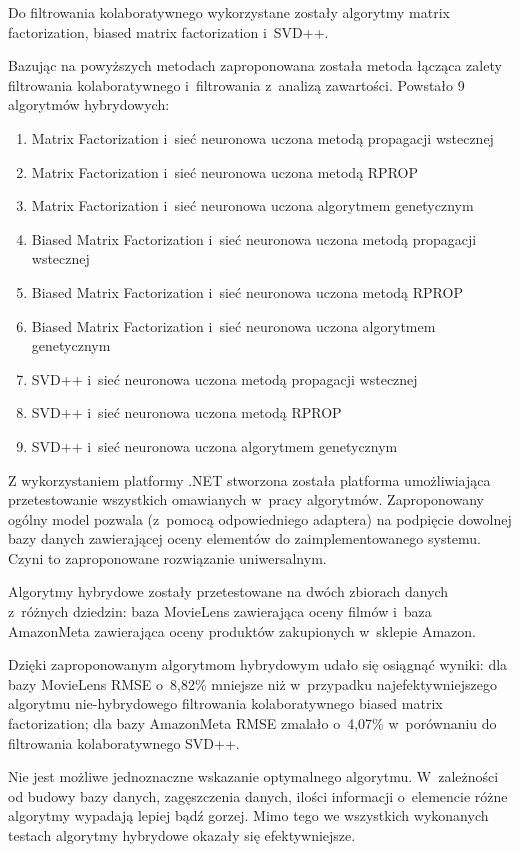\documentclass[twoside]{iisthesis}
\begin{document}
	Do filtrowania kolaboratywnego wykorzystane zostały algorytmy matrix factorization, biased matrix factorization i~SVD++.
	
	Bazując na powyższych metodach zaproponowana została metoda łącząca zalety filtrowania kolaboratywnego i~filtrowania z~analizą zawartości. Powstało 9 algorytmów hybrydowych: 
	
	\begin{enumerate}
		\item Matrix Factorization i~sieć neuronowa uczona metodą propagacji wstecznej
		\item Matrix Factorization i~sieć neuronowa uczona metodą RPROP
		\item Matrix Factorization i~sieć neuronowa uczona algorytmem genetycznym
		\item Biased Matrix Factorization i~sieć neuronowa uczona metodą propagacji wstecznej
		\item Biased Matrix Factorization i~sieć neuronowa uczona metodą RPROP
		\item Biased Matrix Factorization i~sieć neuronowa uczona algorytmem genetycznym
		\item SVD++ i~sieć neuronowa uczona metodą propagacji wstecznej
		\item SVD++ i~sieć neuronowa uczona metodą RPROP
		\item SVD++ i~sieć neuronowa uczona algorytmem genetycznym
	\end{enumerate}
	
	Z wykorzystaniem platformy .NET stworzona została platforma umożliwiająca przetestowanie wszystkich omawianych w~pracy algorytmów. Zaproponowany ogólny model pozwala (z~pomocą odpowiedniego adaptera) na podpięcie dowolnej bazy danych zawierającej oceny elementów do zaimplementowanego systemu. Czyni to zaproponowane rozwiązanie uniwersalnym.
	
	Algorytmy hybrydowe zostały przetestowane na dwóch zbiorach danych z~różnych dziedzin: baza MovieLens zawierająca oceny filmów i~baza AmazonMeta zawierająca oceny produktów zakupionych w~sklepie Amazon. 
	
	Dzięki zaproponowanym algorytmom hybrydowym udało się osiągnąć wyniki: dla bazy MovieLens RMSE o~8,82\% mniejsze niż w~przypadku najefektywniejszego algorytmu nie-hybrydowego filtrowania kolaboratywnego biased matrix factorization; dla bazy AmazonMeta RMSE zmalało o~4,07\% w~porównaniu do filtrowania kolaboratywnego SVD++. 
	
	Nie jest możliwe jednoznaczne wskazanie optymalnego algorytmu. W~zależności od budowy bazy danych, zagęszczenia danych, ilości informacji o~elemencie różne algorytmy wypadają lepiej bądź gorzej.  Mimo tego we wszystkich wykonanych testach algorytmy hybrydowe okazały się efektywniejsze.
	
\end{document}

